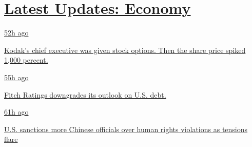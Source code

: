 \hypertarget{latest-updates-economy}{%
\section{\texorpdfstring{\href{https://www.nytimes3xbfgragh.onion/live/2020/07/31/business/stock-market-today-coronavirus?action=click\&pgtype=Article\&state=default\&region=MAIN_CONTENT_1\&context=storylines_live_updates}{Latest
Updates:
Economy}}{Latest Updates: Economy}}\label{latest-updates-economy}}

\href{https://www.nytimes3xbfgragh.onion/live/2020/07/31/business/stock-market-today-coronavirus?action=click\&pgtype=Article\&state=default\&region=MAIN_CONTENT_1\&context=storylines_live_updates\#kodaks-chief-executive-was-given-stock-options-then-the-share-price-spiked-1000-percent}{52h
ago}

\href{https://www.nytimes3xbfgragh.onion/live/2020/07/31/business/stock-market-today-coronavirus?action=click\&pgtype=Article\&state=default\&region=MAIN_CONTENT_1\&context=storylines_live_updates\#kodaks-chief-executive-was-given-stock-options-then-the-share-price-spiked-1000-percent}{Kodak's
chief executive was given stock options. Then the share price spiked
1,000 percent.}

\href{https://www.nytimes3xbfgragh.onion/live/2020/07/31/business/stock-market-today-coronavirus?action=click\&pgtype=Article\&state=default\&region=MAIN_CONTENT_1\&context=storylines_live_updates\#fitch-ratings-downgrades-its-outlook-on-us-debt}{55h
ago}

\href{https://www.nytimes3xbfgragh.onion/live/2020/07/31/business/stock-market-today-coronavirus?action=click\&pgtype=Article\&state=default\&region=MAIN_CONTENT_1\&context=storylines_live_updates\#fitch-ratings-downgrades-its-outlook-on-us-debt}{Fitch
Ratings downgrades its outlook on U.S. debt.}

\href{https://www.nytimes3xbfgragh.onion/live/2020/07/31/business/stock-market-today-coronavirus?action=click\&pgtype=Article\&state=default\&region=MAIN_CONTENT_1\&context=storylines_live_updates\#us-sanctions-more-chinese-officials-over-human-rights-violations-as-tensions-flare}{61h
ago}

\href{https://www.nytimes3xbfgragh.onion/live/2020/07/31/business/stock-market-today-coronavirus?action=click\&pgtype=Article\&state=default\&region=MAIN_CONTENT_1\&context=storylines_live_updates\#us-sanctions-more-chinese-officials-over-human-rights-violations-as-tensions-flare}{U.S.
sanctions more Chinese officials over human rights violations as
tensions flare}

